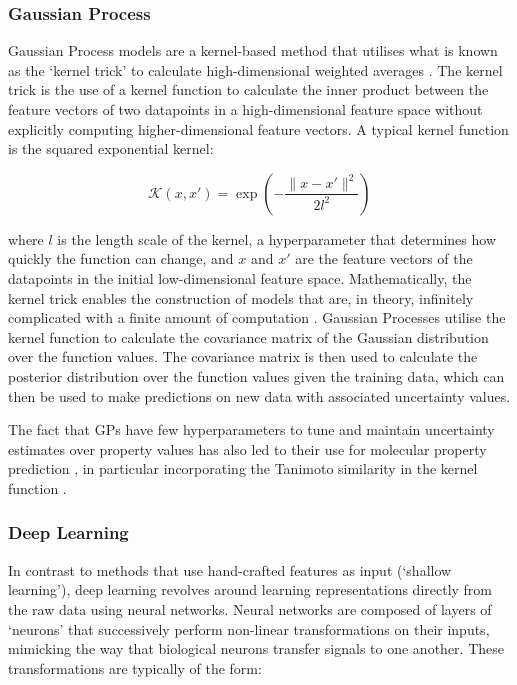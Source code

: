 \subsubsection{Gaussian Process}

Gaussian Process models are a kernel-based method that utilises what is known as the `kernel trick' to calculate high-dimensional weighted averages \cite{rasmussen2005gp}. The kernel trick is the use of a kernel function to calculate the inner product between the feature vectors of two datapoints in a high-dimensional feature space without explicitly computing higher-dimensional feature vectors. A typical kernel function is the squared exponential kernel:

\begin{equation}
 \mathcal{K}(x , x') = \exp\left(-\frac{\|x - x'\|^{2}}{2l^{2}}\right)
\end{equation}

where $l$ is the length scale of the kernel, a hyperparameter that determines how quickly the function can change, and $x$ and $x'$ are the feature vectors of the datapoints in the initial low-dimensional feature space. Mathematically, the kernel trick enables the construction of models that are, in theory, infinitely complicated with a finite amount of computation \cite{Hofmann2008kernel}. Gaussian Processes utilise the kernel function to calculate the covariance matrix of the Gaussian distribution over the function values. The covariance matrix is then used to calculate the posterior distribution over the function values given the training data, which can then be used to make predictions on new data with associated uncertainty values.

The fact that GPs have few hyperparameters to tune and maintain uncertainty estimates over property values has also led to their use for molecular property prediction \cite{Obrezanova2007GPQSAR, McCorkindale2020Soap, Jorner2021ActiviationEnergiesGPR}, in particular incorporating the Tanimoto similarity in the kernel function \cite{Swamidass2005kernels, Griffiths2022photoswitches}.

\subsubsection{Deep Learning}

In contrast to methods that use hand-crafted features as input (`shallow learning'), deep learning revolves around learning representations directly from the raw data using neural networks. Neural networks are composed of layers of `neurons' that successively perform non-linear transformations on their inputs, mimicking the way that biological neurons transfer signals to one another. These transformations are typically of the form:

